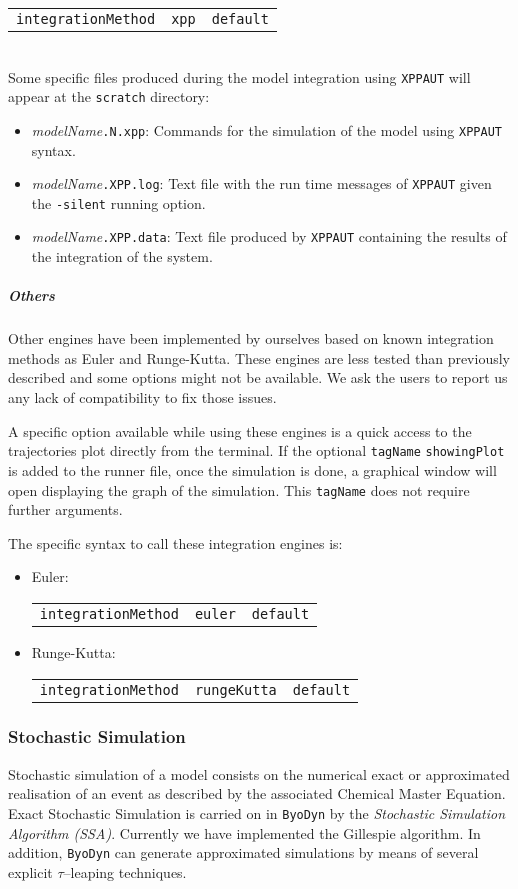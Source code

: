 \documentclass[a4paper, 11pt]{article}
\begin{document}
\begin{tabular}{ccc}\texttt{integrationMethod}&\texttt{xpp}&\texttt{default}\end{tabular}\\[1.5ex]
Some specific files produced during the model integration using \texttt{XPPAUT} will appear at the \texttt{scratch} directory:
\begin{itemize}
  \item \textit{modelName}\texttt{.N.xpp}:
    Commands for the simulation of the model using \texttt{XPPAUT} syntax.
  \item \textit{modelName}\texttt{.XPP.log}:
    Text file with the run time messages of \texttt{XPPAUT} given the \texttt{-silent} running option.
  \item \textit{modelName}\texttt{.XPP.data}:
    Text file produced by \texttt{XPPAUT} containing the results of the integration of the system.
\end{itemize}
\subparagraph{Others}
Other engines have been implemented by ourselves based on known integration methods as Euler and Runge-Kutta.
These engines are less tested than previously described and some options might not be available.
We ask the users to report us any lack of compatibility to fix those issues.

A specific option available while using these engines is a quick access to the trajectories plot directly from the terminal.
If the optional \texttt{tagName} \texttt{showingPlot} is added to the runner file, once the simulation is done, a graphical window will open displaying the graph of the simulation. 
This \texttt{tagName} does not require further arguments.

The specific syntax to call these integration engines is:
\begin{itemize}
\item Euler: \\[1.5ex]
  \begin{tabular}{ccc}\texttt{integrationMethod}&\texttt{euler}&\texttt{default}\end{tabular}
\item Runge-Kutta:\\[1.5ex]
  \begin{tabular}{ccc}\texttt{integrationMethod}&\texttt{rungeKutta}&\texttt{default}\end{tabular}
\end{itemize}
\subsubsection{Stochastic Simulation}
Stochastic simulation of a model consists on the numerical exact or approximated realisation of an event as described by the associated Chemical Master Equation. 
Exact Stochastic Simulation is carried on in \texttt{ByoDyn} by the \emph{Stochastic Simulation Algorithm (SSA)}. 
Currently we have implemented the Gillespie algorithm.
In addition, \texttt{ByoDyn} can generate approximated simulations by means of several explicit $\tau$--leaping techniques.
\end{document}
